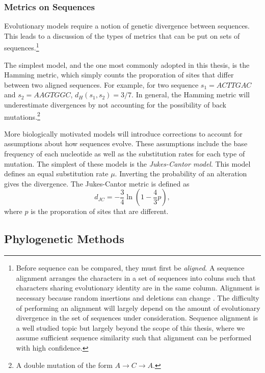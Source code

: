 \subsubsection{Metrics on Sequences}
\label{bg:bio:models:metrics}

Evolutionary models require a notion of genetic divergence between sequences.
This leads to a discussion of the types of metrics that can be put on sets of sequences.\footnote{Before sequence can be compared, they must first be \emph{aligned}. A sequence alignment arranges the characters in a set of sequences into coluns such that characters sharing evolutionary identity are in the same column. Alignment is necessary because random insertions and deletions can change . The difficulty of performing an alignment will largely depend on the amount of evolutionary divergence in the set of sequences under consideration. Sequence alignment is a well studied topic but largely beyond the scope of this thesis, where we assume sufficient sequence similarity such that alignment can be performed with high confidence.}

The simplest model, and the one most commonly adopted in this thesis, is the Hamming metric, which simply counts the proporation of sites that differ between two aligned sequences.
For example, for two sequence $s_1=ACTTGAC$ and $s_2=AAGTGGC$, $d_{H}(s_1,s_2)=3/7$.
In general, the Hamming metric will underestimate divergences by not accounting for the possibility of back mutations.\footnote{A double mutation of the form $A\rightarrow C\rightarrow A$.}

More biologically motivated models will introduce corrections to account for assumptions about how sequences evolve.
These assumptions include the base frequency of each nucleotide as well as the substitution rates for each type of mutation.
The simplest of these models is the \emph{Jukes-Cantor model}.
This model defines an equal substitution rate $\mu$.
Inverting the probability of an alteration gives the divergence.
The Jukes-Cantor metric is defined as 
\begin{equation}
d_{JC}=-\frac{3}{4}\ln(1-\frac{4}{3}p),
\end{equation}
where $p$ is the proporation of sites that are different.

\subsection{Phylogenetic Methods}
\label{bg:bio:phylo}


